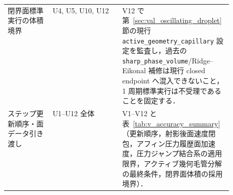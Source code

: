 \begin{table}[!ht]
\begin{tabularx}{\linewidth}{@{}>{\raggedright\arraybackslash}p{0.20\linewidth}>{\raggedright\arraybackslash}p{0.31\linewidth}>{\raggedright\arraybackslash}X@{}}
閉界面標準実行の体積境界 & U4, U5, U10, U12 & V12 で第~\ref{sec:val_oscillating_droplet}節の現行 \texttt{active\_geometry\_capillary} 設定を監査し，過去の \texttt{sharp\_phase\_volume}/Ridge--Eikonal 補修は現行 closed endpoint へ混入できないこと，1 周期標準実行は不受理であることを固定する． \\
7 ステップ更新順序・面データ引き渡し & U1--U12 全体 & V1--V12 と表~\ref{tab:v_accuracy_summary}（更新順序，射影後面速度閉包，アフィン圧力履歴面加速度，圧力ジャンプ結合系の適用限界，アクティブ幾何毛管分解の最終条件，閉界面体積の採用境界）． \\
\bottomrule
\end{tabularx}
\end{table}

\FloatBarrier
